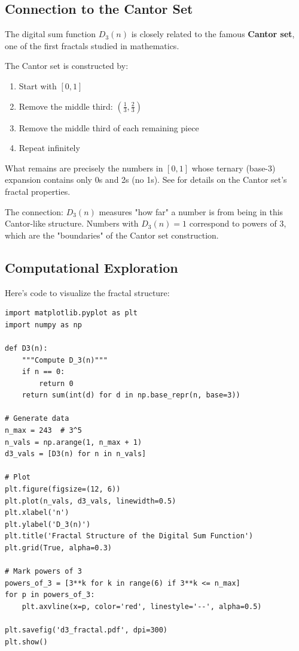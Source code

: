 \subsection{Connection to the Cantor Set}
\label{subsec:cantor-connection}


The digital sum function $D_3(n)$ is closely related to the famous \textbf{Cantor set}, one of the first fractals studied in mathematics.

The Cantor set \cite{cantor1883} is constructed by:
\begin{enumerate}
\item Start with $[0, 1]$
\item Remove the middle third: $(\frac{1}{3}, \frac{2}{3})$
\item Remove the middle third of each remaining piece
\item Repeat infinitely
\end{enumerate}

What remains are precisely the numbers in $[0,1]$ whose ternary (base-3) expansion contains only 0s and 2s (no 1s). See \cite{falconer2004} for details on the Cantor set's fractal properties.

The connection: $D_3(n)$ measures "how far" a number is from being in this Cantor-like structure. Numbers with $D_3(n) = 1$ correspond to powers of 3, which are the "boundaries" of the Cantor set construction.

\subsection{Computational Exploration}
\label{subsec:computational-fractal}

Here's code to visualize the fractal structure:

\begin{lstlisting}[style=python]
import matplotlib.pyplot as plt
import numpy as np

def D3(n):
    """Compute D_3(n)"""
    if n == 0:
        return 0
    return sum(int(d) for d in np.base_repr(n, base=3))

# Generate data
n_max = 243  # 3^5
n_vals = np.arange(1, n_max + 1)
d3_vals = [D3(n) for n in n_vals]

# Plot
plt.figure(figsize=(12, 6))
plt.plot(n_vals, d3_vals, linewidth=0.5)
plt.xlabel('n')
plt.ylabel('D_3(n)')
plt.title('Fractal Structure of the Digital Sum Function')
plt.grid(True, alpha=0.3)

# Mark powers of 3
powers_of_3 = [3**k for k in range(6) if 3**k <= n_max]
for p in powers_of_3:
    plt.axvline(x=p, color='red', linestyle='--', alpha=0.5)

plt.savefig('d3_fractal.pdf', dpi=300)
plt.show()
\end{lstlisting}

